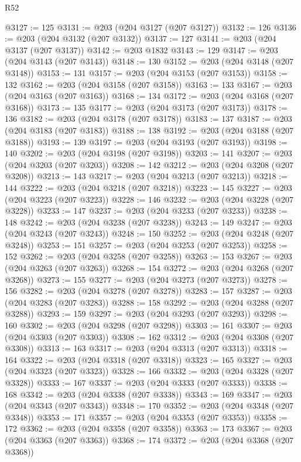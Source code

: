 \begin{lexlean}{R52}
\begin{coremodule}
{{{{{{{{{{{{{{{{{{{{{{{{{{{{{{{{{{{{{{{{{{{{{{{{{{{{{{{{{{{{{{{{{{{{{{{{{{{{{{{{{{{{{{{{{{{{{{{{{{{{{{{{{{{{{{{{{{{{{{{{{{{{{{{{{{{{{{{{{{{{{{{{{{{{{{{{{{{{{{{{{{{{{{{{{{{{{{{{{{{{{{{{{{{{{{{{{{{{{{@3127 := 125
@3131 := @203 (@204 @3127 (@207 @3127))
@3132 := 126
@3136 := @203 (@204 @3132 (@207 @3132))
@3137 := 127
@3141 := @203 (@204 @3137 (@207 @3137))
@3142 := @203 @1832
@3143 := 129
@3147 := @203 (@204 @3143 (@207 @3143))
@3148 := 130
@3152 := @203 (@204 @3148 (@207 @3148))
@3153 := 131
@3157 := @203 (@204 @3153 (@207 @3153))
@3158 := 132
@3162 := @203 (@204 @3158 (@207 @3158))
@3163 := 133
@3167 := @203 (@204 @3163 (@207 @3163))
@3168 := 134
@3172 := @203 (@204 @3168 (@207 @3168))
@3173 := 135
@3177 := @203 (@204 @3173 (@207 @3173))
@3178 := 136
@3182 := @203 (@204 @3178 (@207 @3178))
@3183 := 137
@3187 := @203 (@204 @3183 (@207 @3183))
@3188 := 138
@3192 := @203 (@204 @3188 (@207 @3188))
@3193 := 139
@3197 := @203 (@204 @3193 (@207 @3193))
@3198 := 140
@3202 := @203 (@204 @3198 (@207 @3198))
@3203 := 141
@3207 := @203 (@204 @3203 (@207 @3203))
@3208 := 142
@3212 := @203 (@204 @3208 (@207 @3208))
@3213 := 143
@3217 := @203 (@204 @3213 (@207 @3213))
@3218 := 144
@3222 := @203 (@204 @3218 (@207 @3218))
@3223 := 145
@3227 := @203 (@204 @3223 (@207 @3223))
@3228 := 146
@3232 := @203 (@204 @3228 (@207 @3228))
@3233 := 147
@3237 := @203 (@204 @3233 (@207 @3233))
@3238 := 148
@3242 := @203 (@204 @3238 (@207 @3238))
@3243 := 149
@3247 := @203 (@204 @3243 (@207 @3243))
@3248 := 150
@3252 := @203 (@204 @3248 (@207 @3248))
@3253 := 151
@3257 := @203 (@204 @3253 (@207 @3253))
@3258 := 152
@3262 := @203 (@204 @3258 (@207 @3258))
@3263 := 153
@3267 := @203 (@204 @3263 (@207 @3263))
@3268 := 154
@3272 := @203 (@204 @3268 (@207 @3268))
@3273 := 155
@3277 := @203 (@204 @3273 (@207 @3273))
@3278 := 156
@3282 := @203 (@204 @3278 (@207 @3278))
@3283 := 157
@3287 := @203 (@204 @3283 (@207 @3283))
@3288 := 158
@3292 := @203 (@204 @3288 (@207 @3288))
@3293 := 159
@3297 := @203 (@204 @3293 (@207 @3293))
@3298 := 160
@3302 := @203 (@204 @3298 (@207 @3298))
@3303 := 161
@3307 := @203 (@204 @3303 (@207 @3303))
@3308 := 162
@3312 := @203 (@204 @3308 (@207 @3308))
@3313 := 163
@3317 := @203 (@204 @3313 (@207 @3313))
@3318 := 164
@3322 := @203 (@204 @3318 (@207 @3318))
@3323 := 165
@3327 := @203 (@204 @3323 (@207 @3323))
@3328 := 166
@3332 := @203 (@204 @3328 (@207 @3328))
@3333 := 167
@3337 := @203 (@204 @3333 (@207 @3333))
@3338 := 168
@3342 := @203 (@204 @3338 (@207 @3338))
@3343 := 169
@3347 := @203 (@204 @3343 (@207 @3343))
@3348 := 170
@3352 := @203 (@204 @3348 (@207 @3348))
@3353 := 171
@3357 := @203 (@204 @3353 (@207 @3353))
@3358 := 172
@3362 := @203 (@204 @3358 (@207 @3358))
@3363 := 173
@3367 := @203 (@204 @3363 (@207 @3363))
@3368 := 174
@3372 := @203 (@204 @3368 (@207 @3368))
}}}}}}}}}}}}}}}}}}}}}}}}}}}}}}}}}}}}}}}}}}}}}}}}}}}}}}}}}}}}}}}}}}}}}}}}}}}}}}}}}}}}}}}}}}}}}}}}}}}}}}}}}}}}}}}}}}}}}}}}}}}}}}}}}}}}}}}}}}}}}}}}}}}}}}}}}}}}}}}}}}}}}}}}}}}}}}}}}}}}}}}}}}}}}}}}}}}}}}
\end{coremodule}
\end{lexlean}
